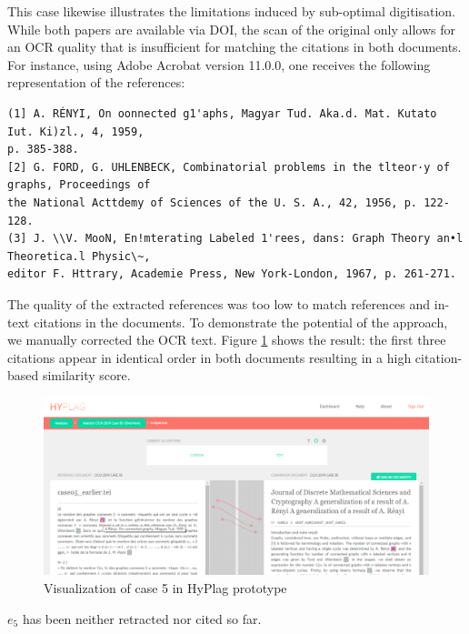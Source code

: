 \documentclass{llncs}
\begin{document}
This case likewise illustrates the limitations induced by sub-optimal digitisation. While both papers are available via DOI, the scan of the original only allows for an OCR quality that is insufficient for matching the citations in both documents. For instance, using Adobe Acrobat version 11.0.0, one receives the following representation of the references:
\begin{lstlisting}[fontadjust=false,breaklines=true,basicstyle=\tiny]
(1] A. RÉNYI, On oonnected g1'aphs, Magyar Tud. Aka.d. Mat. Kutato Iut. Ki)zl., 4, 1959,
p. 385-388.
[2] G. FORD, G. UHLENBECK, Combinatorial problems in the tlteor·y of graphs, Proceedings of
the National Acttdemy of Sciences of the U. S. A., 42, 1956, p. 122-128.
(3] J. \\V. MooN, En!mterating Labeled 1'rees, dans: Graph Theory an•l Theoretica.l Physic\~,
editor F. Httrary, Academie Press, New York-London, 1967, p. 261-271.
\end{lstlisting}

The quality of the extracted references was too low to match references and in-text citations in the documents. To demonstrate the potential of the approach, we manually corrected the OCR text. Figure \ref{fg.case5} shows the result: the first three citations appear in identical order in both documents resulting in a high citation-based similarity score.
\begin{figure}[tb]
\includegraphics[width=\textwidth]{case5.png}
\caption{Visualization of case 5 in HyPlag prototype}\label{fg.case5}
\end{figure}
$e_5$ has been neither retracted nor cited so far.
\end{document}
